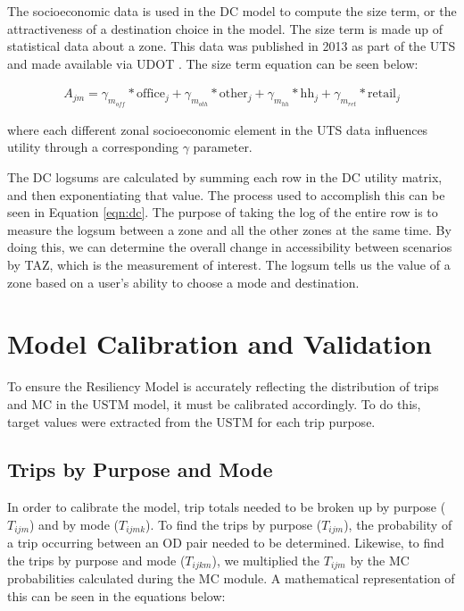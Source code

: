 The socioeconomic data is used in the DC model to compute the size term, or
the attractiveness of
a destination choice in the model. The size term is made up of statistical
data about a zone.
This data was published in 2013 as part of the UTS and made available via
UDOT \citep{uts2013}.  The size term
equation can be seen below:

\begin{equation}
\begin{aligned}
	A_{jm} = \gamma_{m_{off}} * \mathrm{office}_j + \gamma_{m_{oth}} * \mathrm{other}_j + \gamma_{m_{hh}} * \mathrm{hh}_j + \gamma_{m_{ret}} * \mathrm{retail}_j
	\label{eqn:sizeterm}
\end{aligned}
\end{equation}

\noindent where each different zonal socioeconomic element in the UTS data influences
utility through a corresponding $\gamma$ parameter.

The DC logsums are calculated by summing each row in the DC utility matrix,
and then
exponentiating that value. The process used to accomplish this can be seen
in Equation \ref{eqn:dc}.
The purpose of taking the log of the entire row is to measure the logsum
between a zone and all
the other zones at the same time. By doing this, we can determine the overall
change in accessibility
between scenarios by TAZ, which is the measurement of interest. The logsum
tells us the value of
a zone based on a user’s ability to choose a mode and destination.

\section{Model Calibration and Validation}

To ensure the Resiliency Model is accurately reflecting the distribution
of trips and MC in the USTM model, it must be
calibrated accordingly. To do this, target values were extracted from the
USTM for each trip purpose.

\subsection{Trips by Purpose and Mode}

In order to calibrate the model, trip totals needed to be broken up by purpose
(\(T_{ijm}\)) and by mode (\(T_{ijmk}\)). To find the trips by purpose
(\(T_{ijm}\)), the probability of a trip occurring between an OD pair needed to
be determined. Likewise, to find the trips by purpose and mode (\(T_{ijkm}\)),
we multiplied the \(T_{ijm}\) by the MC probabilities calculated during the MC
module. A mathematical representation of this can be seen in the equations
below:

